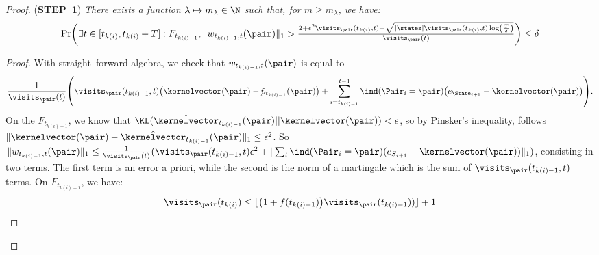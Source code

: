 \documentclass[preprint,cleveref,12pt]{colt2025}
\DeclarePairedDelimiter{\parens}{(}{)}	%
\DeclarePairedDelimiter{\abs}{\lvert}{\rvert}	%
\DeclarePairedDelimiter{\floor}{\lfloor}{\rfloor}	%
\DeclarePairedDelimiter{\norm}{\lVert}{\rVert}	%
\newcommand{\indic}[1]{\ind\parens{#1}}
\def\indicator{\indic}
\def\kernel{\kernelvector}
\def\STEP#1{(\strong{STEP~#1})}
\newcommand{\strong}[1]{\textbf{#1}}
\begin{document}
\begin{proof}
        \par
        \bigskip
        \noindent
        \STEP{1}
        \textit{
            There exists a function $\lambda \mapsto m_\lambda \in \N$ such that, for $m \ge m_\lambda$, we have:
            \begin{equation*}
                \Pr \parens*{
                    \exists t \in [t_{k(i)}, t_{k(i)}+T]
                    :
                    F_{t_{k(i)-1}}, 
                    \norm{w_{t_{k(i)-1}, t}(\pair)}_1
                    >
                    \tfrac { %
                        2 
                        + \epsilon^2 \visits_\pair(t_{k(i)}, t)
                        + \sqrt{\abs{\states} \visits_\pair(t_{k(i)},t) \log\parens*{\frac T\delta}}
                    }{
                        \visits_\pair(t)
                    }
                }
                \le
                \delta
            \end{equation*}
        }
        \begin{proof}
            With straight--forward algebra, we check that $w_{t_{k(i)-1}, t}(\pair)$ is equal to
            \begin{equation}
            \label{equation_likelihood_noise}
                \frac 1{\visits_\pair(t)}
                \parens*{
                    \visits_\pair(t_{k(i)-1}, t) \parens*{\kernel(\pair) - \hat{p}_{t_{k(i)-1}}(\pair)}
                    +
                    \sum_{i=t_{k(i)-1}}^{t-1} \indicator{\Pair_i = \pair} \parens*{e_{\State_{i+1}}-\kernel(\pair)}
                }
                .
            \end{equation}
            On the $F_{t_{k(i)-1}}$, we know that $\KL(\hat{\kernel}_{t_{k(i)-1}}(\pair)||\kernel(\pair)) < \epsilon$, so by Pinsker's inequality, follows $\norm{\kernel(\pair) - \hat{\kernel}_{t_{k(i)-1}}(\pair)}_1 \le \epsilon^2$. 
            So $\norm{w_{t_{k(i)-1}, t}(\pair)}_1 \le \tfrac 1{\visits_\pair(t)} (\visits_\pair(t_{k(i)-1}, t) \epsilon^2 + \norm{\sum_i \indicator{\Pair_i = \pair} (e_{S_{i+1}} - \kernel(\pair))}_1)$, consisting in two terms. 
            The first term is an error a priori, while the second is the norm of a martingale which is the sum of $\visits_\pair(t_{k(i)-1}, t)$ terms.
            On $F_{t_{k(i)-1}}$, we have:
            \begin{align*}
                \visits_\pair(t_{k(i)}) 
                & \le 
                \floor{\parens*{1 + f(t_{k(i)-1})}\visits_\pair(t_{k(i)-1}))} + 1
                \\

\end{align*}
\end{proof}
\end{proof}
\end{document}
